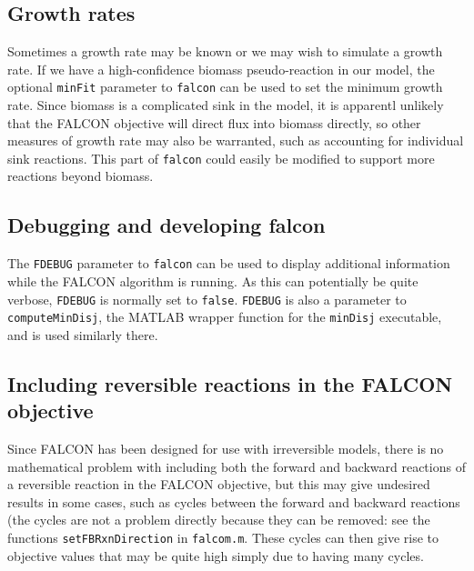 \subsection{Growth rates}
Sometimes a growth rate may be known or we may wish to simulate a
growth rate. If we have a high-confidence biomass pseudo-reaction in
our model, the optional \texttt{minFit} parameter to \texttt{falcon}
can be used to set the minimum growth rate. Since biomass is a
complicated sink in the model, it is apparentl unlikely that the
FALCON objective will direct flux into biomass directly, so other
measures of growth rate may also be warranted, such as accounting
for individual sink reactions. This part of \texttt{falcon} could
easily be modified to support more reactions beyond biomass.

\subsection{Debugging and developing falcon}
The \texttt{FDEBUG} parameter to \texttt{falcon} can be used to
display additional information while the FALCON algorithm is
running. As this can potentially be quite verbose, \texttt{FDEBUG} is
normally set to \texttt{false}. \texttt{FDEBUG} is also a parameter to
\texttt{computeMinDisj}, the MATLAB wrapper function for the
\texttt{minDisj} executable, and is used similarly there.


\subsection{Including reversible reactions in the FALCON objective}
Since FALCON has been designed for use with irreversible models, there
is no mathematical problem with including both the forward and
backward reactions of a reversible reaction in the FALCON objective,
but this may give undesired results in some cases, such as cycles
between the forward and backward reactions (the cycles are not a
problem directly because they can be removed: see the functions
\texttt{setFBRxnDirection} in \texttt{falcom.m}.  These cycles can
then give rise to objective values that may be quite high simply due
to having many cycles.


